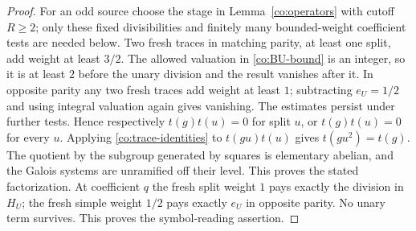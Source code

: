 \begin{proof}
For an odd source choose the stage in Lemma~\ref{co:operators} with
cutoff $R\ge2$; only these fixed divisibilities and finitely many
bounded-weight coefficient tests are needed below.
Two fresh traces in matching parity, at least one split, add weight
at least $3/2$.  The allowed valuation in \eqref{co:BU-bound} is an
integer, so it is at least $2$ before the unary division and the
result vanishes after it.  In opposite parity any two fresh traces
add weight at least $1$; subtracting $e_U=1/2$ and using integral
valuation again gives vanishing.  The estimates persist under
further tests.  Hence respectively
$t(g)t(u)=0$ for split $u$, or $t(g)t(u)=0$ for every $u$.
Applying \eqref{co:trace-identities} to $t(gu)t(u)$ gives
$t(gu^2)=t(g)$.  The quotient by the subgroup generated by squares
is elementary abelian, and the Galois systems are unramified off
their level.  This proves the stated factorization.  At coefficient
$q$ the fresh split weight $1$ pays exactly the division in $H_U$;
the fresh simple weight $1/2$ pays exactly $e_U$ in opposite parity.
No unary term survives.  This proves the symbol-reading assertion.


\end{proof}
